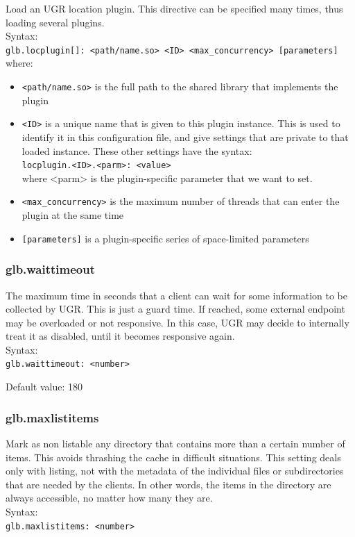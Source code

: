 \documentclass[12pt]{article} %
\begin{document}
 Load an UGR location plugin. This directive can be specified many times, thus loading several plugins.\\
 
 Syntax:\\

\lstinline"glb.locplugin[]: <path/name.so> <ID> <max_concurrency> [parameters]"\\

where:

\begin{itemize}
\item \lstinline"<path/name.so>" is the full path to the shared library that implements the plugin
\item \lstinline"<ID>" is a unique name that is given to this plugin instance. This is used to identify it in this configuration file, and give settings that are private to that loaded instance. These other settings have the syntax:\\
      \lstinline"locplugin.<ID>.<parm>: <value>"\\
     where <parm> is the plugin-specific parameter that we want to set.
\item \lstinline"<max_concurrency>" is the maximum number of threads that can enter the plugin at the same time
\item \lstinline"[parameters]" is a plugin-specific series of space-limited parameters
\end{itemize}


\subsubsection{glb.waittimeout}

The maximum time in seconds that a client can wait for some information to be collected by UGR. This is just a guard time. If reached, some external endpoint may be overloaded or not responsive. In this case, UGR may decide to internally treat it as disabled, until it becomes responsive again.
\\
Syntax:\\
\lstinline"glb.waittimeout: <number>"

Default value: 180

\subsubsection{glb.maxlistitems}
Mark as non listable any directory that contains more than a certain number of items. This avoids thrashing the cache in difficult situations. This setting deals only with listing, not with the metadata of the individual files or subdirectories that are needed by the clients. In other words, the items in the directory are always accessible, no matter how many they are.\\
Syntax:\\
\lstinline"glb.maxlistitems: <number>"
\end{document}
